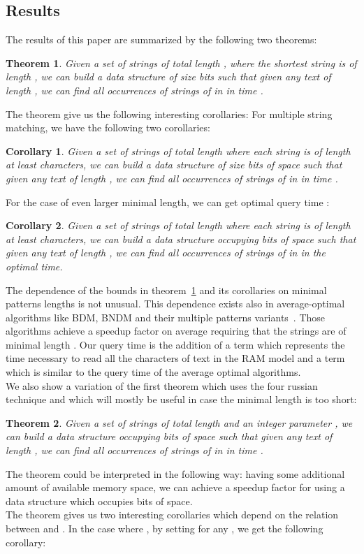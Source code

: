 \documentclass{article}
\newcommand{\?}{\mskip1.5mu}
\newtheorem{theorem}{Theorem}
\newtheorem{corollary}{Corollary}
\begin{document}
\subsection{Results} 
The results of this paper are summarized by the following two theorems: 
\begin{theorem}
\label{theorem1}
Given a set  of  strings of total length , where the shortest string is of length , we can build a data structure of size  bits such that given any text  of length , we can find all occurrences of strings of  in  in time .
\end{theorem}
The theorem give us the following interesting corollaries:
For multiple string matching, we have the following two corollaries:
\begin{corollary}
\label{corollary2}
Given a set  of  strings of total length  where each string is of length at least  characters, we can build a data structure of size  bits of space such that given any text  of length , we can find all occurrences of strings of  in  in time .
\end{corollary}
For the case of even larger minimal length, we can get optimal query time :
\begin{corollary}
\label{corollary3}
Given a set  of  strings of total length  where each string is of length at least  characters, we can build a data structure occupying  bits of space such that given any text  of length , we can find all occurrences of strings of  in  in the optimal  time.
\end{corollary}  
The dependence of the bounds in theorem~\ref{theorem1} and its corollaries on minimal patterns lengths is not unusual. 
This dependence exists also in average-optimal algorithms like BDM, BNDM and their multiple patterns variants~\cite{CR94,CCGJLPR94,NR98}. Those  algorithms achieve a  speedup factor on average requiring that the strings are of minimal length . 
Our query time is the addition of a term which represents the time necessary to read all the characters of text in the RAM model and a term which is similar to the query time of the  average optimal algorithms. 
\\
We also show a variation of the first theorem which uses the four russian technique and which will mostly be useful in case the minimal length is too short: 
\begin{theorem}
\label{theorem2}
Given a set  of  strings of total length  and an integer parameter , we can build a data structure occupying  bits of space such that given any text  of length , we can find all  occurrences of strings of  in  in time .
\end{theorem}
The theorem could be interpreted in the following way: having some additional amount  of available memory space, we can achieve a speedup factor  for  using a data structure which occupies  bits of space.  
\\ The theorem gives us two interesting corollaries which depend on the relation between  and . In the case where , by setting  for any , we get the following corollary: 
\end{document}
